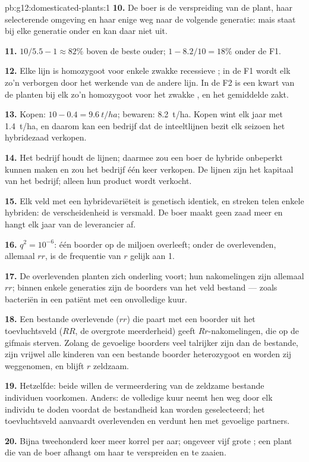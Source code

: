 \begin{solution}{pb:g12:domesticated-plants:1}
\textbf{10.} De boer is de verspreiding van de plant, haar selecterende
omgeving en haar enige weg naar de volgende generatie: mais staat bij elke
generatie onder  en kan daar niet uit.

\textbf{11.} $10/5.5 - 1 \approx 82\%$ boven de beste ouder;
$1 - 8.2/10 = 18\%$ onder de F1.

\textbf{12.} Elke lijn is homozygoot voor enkele zwakke recessieve
; in de F1 wordt elk zo'n  verborgen door het werkende 
van de andere lijn. In de F2 is een kwart van de planten bij elk zo'n 
homozygoot voor het zwakke , en het gemiddelde zakt.

\textbf{13.} Kopen: $10 - 0.4 = \qty{9.6}{t/ha}$; bewaren: \qty{8.2}{t/ha}.
Kopen wint elk jaar met \qty{1.4}{t/ha}, en daarom kan een bedrijf dat de
inteeltlijnen bezit elk seizoen het hybridezaad verkopen.

\textbf{14.} Het bedrijf houdt de lijnen; daarmee zou een boer de hybride
onbeperkt kunnen maken en zou het bedrijf één keer verkopen. De lijnen
zijn het kapitaal van het bedrijf; alleen hun product wordt verkocht.

\textbf{15.} Elk veld met een hybridevariëteit is genetisch identiek, en
streken telen enkele hybriden: de verscheidenheid is versmald. De boer
maakt geen zaad meer en hangt elk jaar van de leverancier af.

\textbf{16.} $q^2 = 10^{-6}$: één boorder op de miljoen overleeft; onder
de overlevenden, allemaal $rr$, is de frequentie van $r$ gelijk aan 1.

\textbf{17.} De overlevenden planten zich onderling voort; hun
nakomelingen zijn allemaal $rr$; binnen enkele generaties zijn de boorders
van het veld bestand --- zoals bacteriën in een patiënt met een
onvolledige kuur.

\textbf{18.} Een bestande overlevende ($rr$) die paart met een boorder uit
het toevluchtsveld ($RR$, de overgrote meerderheid) geeft
$Rr$-nakomelingen, die op de gifmais sterven. Zolang de gevoelige boorders
veel talrijker zijn dan de bestande, zijn vrijwel alle kinderen van een
bestande boorder heterozygoot en worden zij weggenomen, en blijft $r$
zeldzaam.

\textbf{19.} Hetzelfde: beide willen de vermeerdering van de zeldzame
bestande individuen voorkomen. Anders: de volledige kuur neemt hen weg
door elk individu te doden voordat de bestandheid kan worden
geselecteerd; het toevluchtsveld aanvaardt overlevenden en verdunt hen met
gevoelige partners.

\textbf{20.} Bijna tweehonderd keer meer korrel per aar; ongeveer vijf
grote ; een plant die van de boer afhangt om haar te verspreiden en
te zaaien.
\end{solution}
